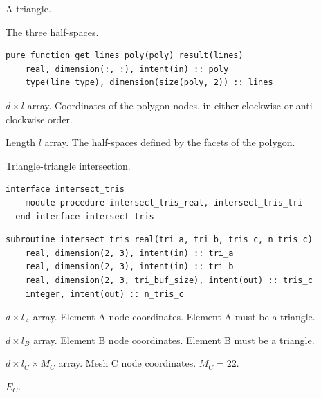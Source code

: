 \documentclass{article}
\begin{document}
\begin{description}[font=\ttfamily\bfseries,leftmargin=2.2\parindent,labelindent=1.7\parindent,noitemsep]
  \item[tri] A triangle.
  \item[lines] The three half-spaces.
\end{description}

\begin{lstlisting}[language=FORTRAN]
  pure function get_lines_poly(poly) result(lines)
    real, dimension(:, :), intent(in) :: poly    
    type(line_type), dimension(size(poly, 2)) :: lines
\end{lstlisting}

\begin{description}[font=\ttfamily\bfseries,leftmargin=2.2\parindent,labelindent=1.7\parindent,noitemsep]
  \item[poly] $d \times l$ array. Coordinates of the polygon nodes, in either
    clockwise or anti-clockwise order.
  \item[lines] Length $l$ array. The half-spaces defined by the facets of the
    polygon.
\end{description}

\noindent Triangle-triangle intersection.

\begin{lstlisting}[language=FORTRAN]
  interface intersect_tris
    module procedure intersect_tris_real, intersect_tris_tri
  end interface intersect_tris
\end{lstlisting}

\begin{lstlisting}[language=FORTRAN]
  subroutine intersect_tris_real(tri_a, tri_b, tris_c, n_tris_c)
    real, dimension(2, 3), intent(in) :: tri_a
    real, dimension(2, 3), intent(in) :: tri_b
    real, dimension(2, 3, tri_buf_size), intent(out) :: tris_c
    integer, intent(out) :: n_tris_c
\end{lstlisting}

\begin{description}[font=\ttfamily\bfseries,leftmargin=2.2\parindent,labelindent=1.7\parindent,noitemsep]
  \item[tri\_a] $d \times l_A$ array. Element A node coordinates. Element A
    must be a triangle.
  \item[tri\_b] $d \times l_B$ array. Element B node coordinates. Element B
    must be a triangle.
  \item[tris\_c] $d \times l_C \times M_C$ array. Mesh C node coordinates.
    $M_C = 22$.
  \item[n\_tris\_c] $E_C$.
\end{description}
\end{document}
